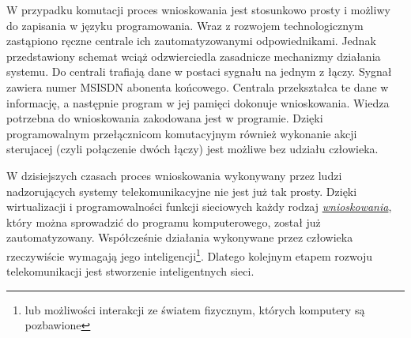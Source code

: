 W przypadku komutacji proces wnioskowania jest stosunkowo prosty i możliwy do zapisania w języku programowania. Wraz z rozwojem technologicznym zastąpiono ręczne centrale ich zautomatyzowanymi odpowiednikami. Jednak przedstawiony schemat wciąż odzwierciedla zasadnicze mechanizmy działania systemu. Do centrali trafiają dane w postaci sygnału na jednym z łączy. Sygnał zawiera numer MSISDN abonenta końcowego. Centrala przekształca te dane w informację, a następnie program w jej pamięci dokonuje wnioskowania. Wiedza potrzebna do wnioskowania zakodowana jest w programie. Dzięki programowalnym przełącznicom komutacyjnym również wykonanie akcji sterujacej (czyli połączenie dwóch łączy) jest możliwe bez udziału człowieka. 

W dzisiejszych czasach proces wnioskowania wykonywany przez ludzi nadzorujących systemy telekomunikacyjne nie jest już tak prosty. Dzięki wirtualizacji i programowalności funkcji sieciowych każdy rodzaj \hyperlink{def:wnioskowanie}{\textit{wnioskowania}}, który można sprowadzić do programu komputerowego, został już zautomatyzowany. Współcześnie działania wykonywane przez człowieka rzeczywiście wymagają jego inteligencji\footnote{lub możliwości interakcji ze światem fizycznym, których komputery są pozbawione}. Dlatego kolejnym etapem rozwoju telekomunikacji jest stworzenie inteligentnych sieci.